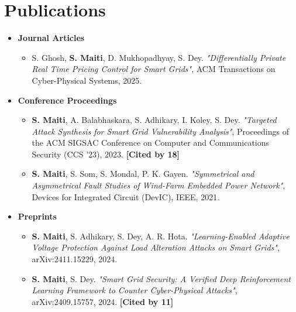 \documentclass[letterpaper,11pt]{article}
\begin{document}
\section{Publications}
  \begin{itemize}[leftmargin=0.15in, label={}]
    \item \textbf{Journal Articles}
    \vspace{-4pt}
    \begin{itemize}[leftmargin=0.2in, label={$\vcenter{\hbox{\tiny$\bullet$}}$}]
        \item S. Ghosh, \textbf{S. Maiti}, D. Mukhopadhyay, S. Dey. \textit{"Differentially Private Real Time Pricing Control for Smart Grids"}, ACM Transactions on Cyber-Physical Systems, 2025.
    \end{itemize}
    \vspace{4pt}

    \item \textbf{Conference Proceedings}
    \vspace{-4pt}
    \begin{itemize}[leftmargin=0.2in, label={$\vcenter{\hbox{\tiny$\bullet$}}$}]
        \item \textbf{S. Maiti}, A. Balabhaskara, S. Adhikary, I. Koley, S. Dey. \textit{"Targeted Attack Synthesis for Smart Grid Vulnerability Analysis"}, Proceedings of the ACM SIGSAC Conference on Computer and Communications Security (CCS '23), 2023. \textbf{[Cited by 18]}
        \item \textbf{S. Maiti}, S. Som, S. Mondal, P. K. Gayen. \textit{"Symmetrical and Asymmetrical Fault Studies of Wind-Farm Embedded Power Network"}, Devices for Integrated Circuit (DevIC), IEEE, 2021.
    \end{itemize}
    \vspace{4pt}

    \item \textbf{Preprints}
    \vspace{-4pt}
    \begin{itemize}[leftmargin=0.2in, label={$\vcenter{\hbox{\tiny$\bullet$}}$}]
        \item \textbf{S. Maiti}, S. Adhikary, S. Dey, A. R. Hota. \textit{"Learning-Enabled Adaptive Voltage Protection Against Load Alteration Attacks on Smart Grids"}, arXiv:2411.15229, 2024.
        \item \textbf{S. Maiti}, S. Dey. \textit{"Smart Grid Security: A Verified Deep Reinforcement Learning Framework to Counter Cyber-Physical Attacks"}, arXiv:2409.15757, 2024. \textbf{[Cited by 11]}
    \end{itemize}
  \end{itemize}
\end{document}
